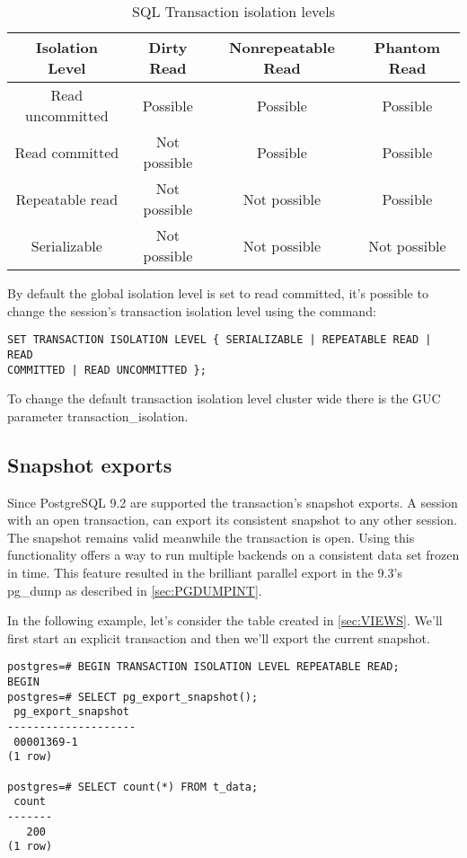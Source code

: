 \begin{table}[H]
  \begin{tabular}{cccc}
    Isolation Level & Dirty Read    &    Nonrepeatable Read   &   Phantom 
Read\\ 
    \hline
    Read uncommitted  &  Possible    &    Possible     &   Possible\\
    Read committed    &  Not possible &  Possible     &   Possible\\
    Repeatable read   &  Not possible  & Not possible  &  Possible\\
    Serializable      &  Not possible  & Not possible   & Not possible\\
  \end{tabular}
  \caption{\label{tab:TRNISOLATION}SQL Transaction isolation levels}
\end{table}

By default the global isolation level is set to read committed, it's possible 
to change the session's transaction isolation level using the command:
\begin{lstlisting}[style=pgsql]
SET TRANSACTION ISOLATION LEVEL { SERIALIZABLE | REPEATABLE READ | READ 
COMMITTED | READ UNCOMMITTED }; 
\end{lstlisting}

To change the default transaction isolation level cluster wide there is the GUC 
parameter transaction\_isolation.


\subsection{Snapshot exports}
\label{sub:SNAPEXPORT}
Since PostgreSQL 9.2 are supported the transaction's snapshot exports. A session with an open 
transaction, can export its consistent snapshot to any other session. The snapshot remains valid 
meanwhile the transaction is open. Using this functionality offers a way to run multiple backends 
on a consistent data set frozen in time. This feature resulted in the brilliant parallel export in 
the 9.3's pg\_dump as described in \ref{sec:PGDUMPINT}.\newline

In the following example, let's consider the table created in \ref{sec:VIEWS}. We'll first start an 
explicit transaction and then we'll export the current snapshot.

\begin{lstlisting}[style=pgsql]
postgres=# BEGIN TRANSACTION ISOLATION LEVEL REPEATABLE READ;
BEGIN
postgres=# SELECT pg_export_snapshot();
 pg_export_snapshot 
--------------------
 00001369-1
(1 row)

postgres=# SELECT count(*) FROM t_data;
 count 
-------
   200
(1 row)

\end{lstlisting}

